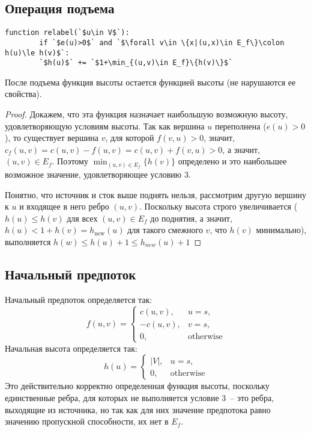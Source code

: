 \subsection{Операция подъема}
\begin{lstlisting}[escapeinside=``]
	function relabel(`$u\in V$`):
		if `$e(u)>0$` and `$\forall v\in \{x|(u,x)\in E_f\}\colon h(u)\le h(v)$`:
		`$h(u)$` += `$1+\min_{(u,v)\in E_f}\{h(v)\}$`
\end{lstlisting}
\begin{lemma}
	После подъема функция высоты остается функцией высоты (не нарушаются ее свойства).
\end{lemma}
\begin{proof}
	Докажем, что эта функция назначает наибольшую возможную высоту, удовлетворяющую условиям высоты. Так как вершина $u$ переполнена ($e(u)>0$), то существует вершина $v$, для которой $f(v,u)>0$, значит, $c_f(u,v)=c(u,v)-f(u,v)=c(u,v)+f(v,u)>0$, а значит, $(u,v)\in E_f$. Поэтому $\min_{(u,v)\in E_f}\{h(v)\}$ определено и это наибольшее возможное значение, удовлетворяющее условию 3.
	
	Понятно, что источник и сток выше поднять нельзя, рассмотрим другую вершину к $u$ и входящее в него ребро $(u,v)$. Поскольку высота строго увеличивается ($h(u)\le h(v)$ для всех $(u,v)\in E_f$ до поднятия, а значит, $h(u)<1+h(v)=h_\mathrm{new}(u)$ для такого смежного $v$, что $h(v)$ минимально), выполняется $h(w)\le h(u)+1\le h_{new}(u)+1$
\end{proof}

\subsection{Начальный предпоток}
Начальный предпоток определяется так:
$$
f(u,v)=\begin{cases}
	c(u,v), & u=s,\\
	-c(u,v), & v=s,\\
	0, & \mathrm{otherwise}
\end{cases}
$$
Начальная высота определяется так:
$$
h(u)=\begin{cases}
|V|, & u=s,\\
0, & \mathrm{otherwise}
\end{cases}
$$
Это действительно корректно определенная функция высоты, поскольку единственные ребра, для которых не выполняется условие 3~-- это ребра, выходящие из источника, но так как для них значение предпотока равно значению пропускной способности, их нет в $E_f$.

